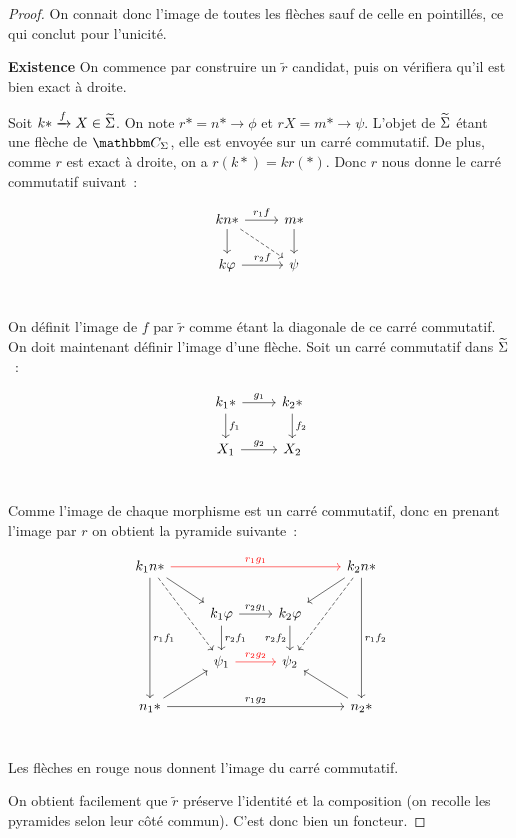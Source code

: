 \begin{proof}
    On connait donc l'image de toutes les flèches sauf de celle en pointillés, ce qui
    conclut pour l'unicité.

    \textbf{Existence} On commence par construire un $\tilde{r}$ candidat, puis on
    vérifiera qu'il est bien exact à droite.
    
    Soit $k\ast\xrightarrow{f} X\in\widetilde{\Sigma}$. On note $r\ast = n\ast\rightarrow\phi$
    et $rX = m\ast\rightarrow\psi$. L'objet de $\widetilde{\Sigma}$ étant une flèche de $\C_\Sigma$,
    elle est envoyée sur un carré commutatif. De plus, comme $r$ est exact à droite,
    on a $r(k\ast) = kr(\ast)$. Donc $r$ nous donne le carré commutatif suivant~:

    \[\begin{tikzcd}
        kn\ast\arrow[r, "r_1f"]\arrow[d]\arrow[dr,dashed] & m\ast\arrow[d] \\
        k\phi\arrow[r, "r_2f"] & \psi \\
    \end{tikzcd}\]

    On définit l'image de $f$ par $\tilde{r}$ comme étant la diagonale de ce carré
    commutatif. On doit maintenant définir l'image d'une flèche. Soit un carré commutatif
    dans $\widetilde{\Sigma}$~:

    \[\begin{tikzcd}
        k_1\ast\arrow[r,"g_1"]\arrow[d,"f_1"] & k_2\ast\arrow[d,"f_2"] \\
        X_1\arrow[r,"g_2"] & X_2 \\
    \end{tikzcd}\]

    Comme l'image de chaque morphisme est un carré commutatif, donc en prenant
    l'image par $r$ on obtient la pyramide suivante~:

    \[\begin{tikzcd}
        k_1n\ast\arrow[rrr,red,"r_1g_1"]\arrow[dr]\arrow[ddd, "r_1f_1"]\arrow[ddr,dashed]
            & & & k_2n\ast\arrow[dl]\arrow[ddd, "r_1f_2"]\arrow[ddl,dashed] \\
        & k_1\phi\arrow[r,"r_2g_1"]\arrow[d,"r_2f_1"]
            & k_2\phi\arrow[d,swap,"r_2f_2"] & \\
        & \psi_1\arrow[r,red,"r_2g_2"]
            & \psi_2 & \\
        n_1\ast\arrow[ur]\arrow[rrr,"r_1g_2"]
            & & & n_2\ast\arrow[ul] \\
    \end{tikzcd}\]

    Les flèches en rouge nous donnent l'image du carré commutatif.

    On obtient facilement que $\tilde{r}$ préserve l'identité et la composition
    (on recolle les pyramides selon leur côté commun). C'est donc bien un foncteur.


\end{proof}


